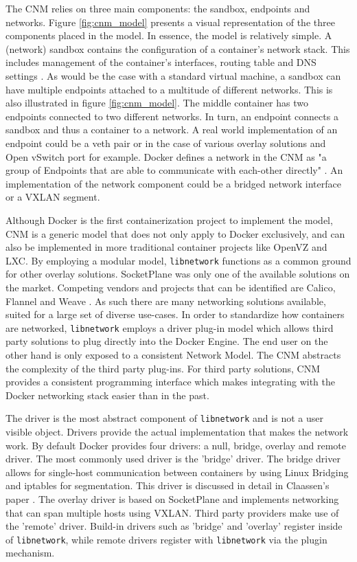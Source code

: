The CNM relies on three main components: the sandbox, endpoints and networks. Figure \ref{fig:cnm_model} presents a visual representation of the three components placed in the model. In essence, the model is relatively simple. A (network) sandbox contains the configuration of a container's network stack. This includes management of the container's interfaces, routing table and DNS settings \cite{GITHUB}. As would be the case with a standard virtual machine, a sandbox can have multiple endpoints attached to a multitude of different networks. This is also illustrated in figure \ref{fig:cnm_model}. The middle container has two endpoints connected to two different networks. In turn, an endpoint connects a sandbox and thus a container to a network. A real world implementation of an endpoint could be a veth pair or in the case of various overlay solutions and Open vSwitch port for example. Docker defines a network in the CNM as "a group of Endpoints that are able to communicate with each-other directly" \cite{GITHUB}. An implementation of the network component could be a bridged network interface or a VXLAN segment.

Although Docker is the first containerization project to implement the model, CNM is a generic model that does not only apply to Docker exclusively, and can also be implemented in more traditional container projects like OpenVZ and LXC. By employing a modular model, \texttt{libnetwork} functions as a common ground for other overlay solutions. SocketPlane was only one of the available solutions on the market. Competing vendors and projects that can be identified are Calico, Flannel and Weave \cite{jorisclaassen2015}. As such there are many networking solutions available, suited for a large set of diverse use-cases. In order to standardize how containers are networked, \texttt{libnetwork} employs a driver plug-in model which allows third party solutions to plug directly into the Docker Engine. The end user on the other hand is only exposed to a consistent Network Model. The CNM abstracts the complexity of the third party plug-ins. For third party solutions, CNM provides a consistent programming interface which makes integrating with the Docker networking stack easier than in the past. 

The driver is the most abstract component of \texttt{libnetwork} and is not a user visible object. Drivers provide the actual implementation that makes the network work. By default Docker provides four drivers: a null, bridge, overlay and remote driver. The most commonly used driver is the 'bridge' driver. The bridge driver allows for single-host communication between containers by using Linux Bridging and iptables for segmentation. This driver is discussed in detail in Claassen's paper \cite{jorisclaassen2015}. The overlay driver is based on SocketPlane and implements networking that can span multiple hosts using VXLAN. Third party providers make use of the 'remote' driver. Build-in drivers such as 'bridge' and 'overlay' register inside of \texttt{libnetwork}, while remote drivers register with \texttt{libnetwork} via the plugin mechanism. 

